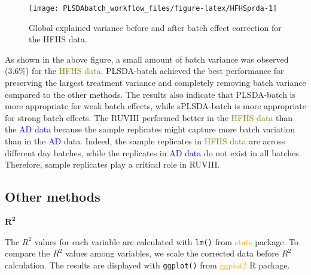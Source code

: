 \documentclass[
]{book}
\begin{document}
\begin{figure}

{\centering \texttt{[image: PLSDAbatch\_workflow\_files/figure-latex/HFHSprda-1]} 

}

\caption{Global explained variance before and after batch effect correction for the HFHS data.}\label{fig:HFHSprda}
\end{figure}

As shown in the above figure, a small amount of batch variance was observed (3.6\%) for the \textcolor{olive}{HFHS data}. PLSDA-batch achieved the best performance for preserving the largest treatment variance and completely removing batch variance compared to the other methods. The results also indicate that PLSDA-batch is more appropriate for weak batch effects, while sPLSDA-batch is more appropriate for strong batch effects. The RUVIII performed better in the \textcolor{olive}{HFHS data} than the \textcolor{blue}{AD data} because the sample replicates might capture more batch variation than in the \textcolor{blue}{AD data}. Indeed, the sample replicates in \textcolor{olive}{HFHS data} are across different day batches, while the replicates in \textcolor{blue}{AD data} do not exist in all batches. Therefore, sample replicates play a critical role in RUVIII.

\hypertarget{other-methods-1}{%
\subsection{Other methods}\label{other-methods-1}}

\(\mathbf{R^2}\)

The \(R^2\) values for each variable are calculated with \texttt{lm()} from \textcolor{orange}{stats} package. To compare the \(R^2\) values among variables, we scale the corrected data before \(R^2\) calculation. The results are displayed with \texttt{ggplot()} from \textcolor{orange}{ggplot2} R package.
\end{document}
